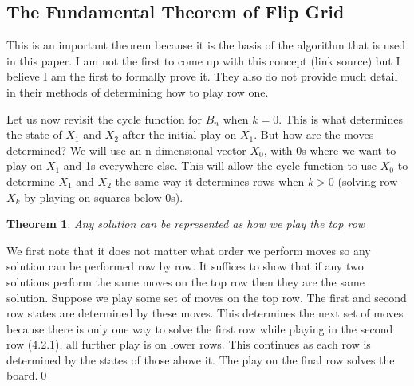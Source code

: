 \documentclass{article}
\newtheorem{theorem}{Theorem}[subsection]
\begin{document}
  \subsection{The Fundamental Theorem of Flip Grid}
  This is an important theorem because it is the basis of the algorithm that is used in this paper. I am not the first to come up with this concept (link source) but I believe I am the first to formally prove it. They also do not provide much detail in their methods of determining how to play row one.\par
  Let us now revisit the cycle function for $B_n$ when $k=0$. This is what determines the state of $X_1$ and $X_2$ after the initial play on $X_1$. But how are the moves determined? We will use an n-dimensional vector $X_0$, with 0s where we want to play on $X_1$ and 1s everywhere else. This will allow the cycle function to use $X_0$ to determine $X_1$ and $X_2$ the same way it determines rows when $k>0$ (solving row $X_k$ by playing on squares below 0s).
  \begin{theorem}
    Any solution can be represented as how we play the top row
  \end{theorem}
  We first note that it does not matter what order we perform moves so any solution can be performed row by row. It suffices to show that if any two solutions perform the same moves on the top row then they are the same solution. Suppose we play some set of moves on the top row. The first and second row states are determined by these moves. This determines the next set of moves because there is only one way to solve the first row while playing in the second row (4.2.1), all further play is on lower rows. This continues as each row is determined by the states of those above it. The play on the final row solves the board.\qed
\end{document}
